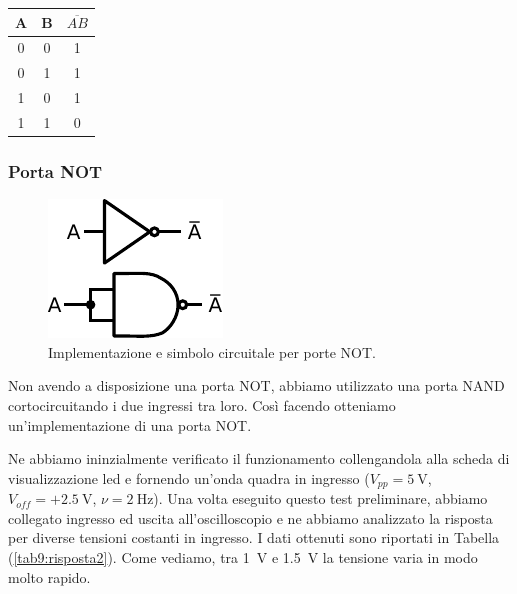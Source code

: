 \vspace{-5mm}
\begin{table}[htpc]
\begin{minipage}{0.6\textwidth}
\centering
{\renewcommand{\arraystretch}{1.2}%
\begin{tabular}{|c|c|c|}
\hline
A & B & $\overline{AB}$ \\
\hline
0 & 0 & 1\\
\hline
0 & 1 & 1\\
\hline
1 & 0 & 1\\
\hline
1 & 1 & 0\\
\hline
\end{tabular}}
\label{tab9:NAND}
\end{minipage}
\end{table}
\vspace{-4mm}

\subsubsection{Porta NOT}


\begin{figure}
\centering
\includegraphics[width=.16\textwidth]{../E09/latex/NOT.pdf}
\caption{Implementazione e simbolo circuitale per porte NOT.}
\label{cir9:not}
\end{figure}

Non avendo a disposizione una porta NOT, abbiamo utilizzato una porta NAND cortocircuitando i due ingressi tra loro.
Così facendo otteniamo un'implementazione di una porta NOT.

Ne abbiamo ininzialmente verificato il funzionamento collengandola alla scheda di visualizzazione led e fornendo un'onda quadra in ingresso ($V_{pp}=\SI{5}{\volt}$, $V_{off}=+\SI{2.5}{\volt}$, $\nu=\SI{2}{\hertz}$).
Una volta eseguito questo test preliminare, abbiamo collegato ingresso ed uscita all'oscilloscopio e ne abbiamo analizzato la risposta per diverse tensioni costanti in ingresso.
I dati ottenuti sono riportati in Tabella (\ref{tab9:risposta2}).
Come vediamo, tra \SI{1}{\volt} e \SI{1.5}{\volt} la tensione varia in modo molto rapido.

